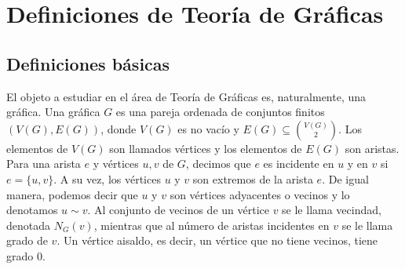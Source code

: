 \chapter{Definiciones de Teor\'ia de Gr\'aficas}%
\label{cap:defs grafs}

\section{Definiciones b\'asicas}%
\label{sec:def-basicas}

El objeto a estudiar en el \'area de Teor\'ia de Gr\'aficas es, naturalmente,
una gr\'afica. Una gr\'afica $G$ es una pareja ordenada de conjuntos finitos
$(V(G), E(G))$, donde $V(G)$ es no vac\'io y $E(G) \subseteq \binom{V(G)}{2}$.
Los elementos de $V(G)$ son llamados v\'ertices y los elementos de $E(G)$ son
aristas. Para una arista $e$ y v\'ertices $u, v$ de $G$, decimos que $e$ es
incidente en $u$ y en $v$ si $e= \{u, v\}$. A su vez, los v\'ertices $u$ y $v$
son extremos de la arista $e$. De igual manera, podemos decir que $u$ y $v$ son
v\'ertices adyacentes o vecinos y lo denotamos $u \sim v$. Al conjunto de
vecinos de un v\'ertice $v$ se le llama vecindad, denotada $N_G(v)$, mientras
que al n\'umero de aristas incidentes en $v$ se le llama grado de $v$. Un
v\'ertice aisaldo, es decir, un v\'ertice que no tiene vecinos, tiene grado $0$.


